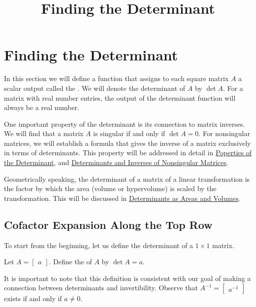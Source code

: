 \documentclass{ximera}
\title{Finding the Determinant} \license{CC BY-NC-SA 4.0}
\begin{document}
\begin{abstract}

\end{abstract}
\maketitle

\section*{Finding the Determinant}
In this section we will define a function that assigns to each square matrix $A$ a scalar output called the .  We will denote the determinant of $A$ by $\det{A}$.  For a matrix with real number entries, the output of the determinant function will always be a real number.

One important property of the determinant is its connection to matrix inverses.  We will find that a matrix $A$ is singular if and only if $\det{A}=0$.  For nonsingular matrices, we will establish a formula that gives the inverse of a matrix exclusively in terms of determinants.  This property will be addressed in detail in \href{https://ximera.osu.edu/oerlinalg/LinearAlgebra/DET-0040/main}{Poperties of the Determinant}, and \href{https://ximera.osu.edu/oerlinalg/LinearAlgebra/DET-0060/main}{Determinants and Inverses of Nonsingular Matrices}.

Geometrically speaking, the determinant of a matrix of a linear transformation is the factor by which the area (volume or hypervolume) is scaled by the transformation.  This will be discussed in \href{https://ximera.osu.edu/oerlinalg/LinearAlgebra/DET-0070/main}{Determinants as Areas and Volumes}. 

\subsection*{Cofactor Expansion Along the Top Row}
To start from the beginning, let us define the determinant of a $1\times 1$ matrix.
\begin{definition}\label{def:onebyonedet} Let
$A=\begin{bmatrix}a\end{bmatrix}$.  Define the  of $A$ by $\det{A}=a$.
\end{definition}
It is important to note that this definition is consistent with our goal of making a connection between determinants and invertibility.  Observe that $A^{-1}=\begin{bmatrix}a^{-1}\end{bmatrix}$ exists if and only if $a\neq 0$.
\end{document}
